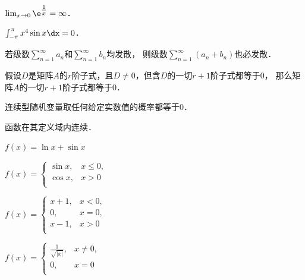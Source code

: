 \documentclass[plain,noanswer,medmath]{../../template/jnuexam}
\begin{document}




\begin{problem}
$\lim_{x \to 0} \e^{\tfrac{1}{x}} = \infty$．\tickout{}
\end{problem}


\begin{problem}
$\int_{-\pi}^{\pi} x^4\sin x\dx = 0$．\tickout{}
\end{problem}


\begin{problem}
若级数$\sum_{n = 1}^{\infty}a_n$和$\sum_{n = 1}^{\infty}b_n$均发散，
则级数$\sum_{n = 1}^{\infty}(a_n + b_n)$也必发散．\tickout{}
\end{problem}


\begin{problem}
假设$D$是矩阵$A$的$r$阶子式，且$D \ne 0$，但含$D$的一切$r + 1$阶子式都等于$0$，
那么矩阵$A$的一切$r + 1$阶子式都等于$0$．\tickout{}
\end{problem}


\begin{problem}
连续型随机变量取任何给定实数值的概率都等于$0$．\tickout{}
\end{problem}




\begin{problem}
函数\pickin{}在其定义域内连续．
\begin{abcd}
\item $f(x) = \ln x + \sin x$
\item $f(x) = \begin{cases}
  \sin x, & x \le 0, \\
  \cos x, & x > 0 \\
\end{cases}$
\item $f(x) = \begin{cases}
  x + 1, &  x < 0, \\
      0, &  x = 0, \\
  x - 1, &  x > 0 \\
\end{cases}$
\item $f(x) = \begin{cases}
  \frac{1}{\sqrt{|x|}}, & x \ne 0, \\
                     0, & x = 0 \\
\end{cases}$
\end{abcd}
\end{problem}
\end{document}
